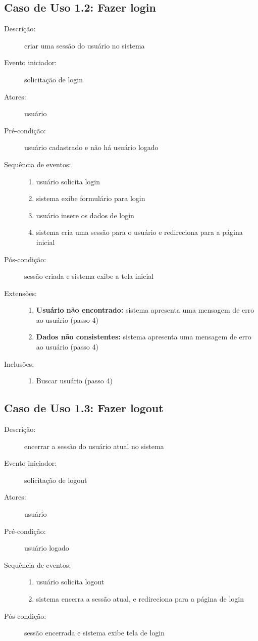 \subsection{Caso de Uso 1.2: Fazer login}
\begin{description}
	\item[Descrição:] criar uma sessão do usuário no sistema
	\item[Evento iniciador:] solicitação de login
	\item[Atores:] usuário
	\item[Pré-condição:] usuário cadastrado e não há usuário logado
	\item[Sequência de eventos:] \hfill
		\begin{enumerate}
			\item{usuário solicita login}
			\item{sistema exibe formulário para login}
			\item{usuário insere os dados de login}
			\item{sistema cria uma sessão para o usuário e redireciona para a página inicial}
		\end{enumerate}
	\item[Pós-condição:] sessão criada e sistema exibe a tela inicial
	\item[Extensões:] \hfill
		\begin{enumerate}
			\item{\textbf{Usuário não encontrado:} sistema apresenta uma mensagem de erro ao usuário (passo 4)}
			\item{\textbf{Dados não consistentes:} sistema apresenta uma mensagem de erro ao usuário (passo 4)}
		\end{enumerate}
	\item[Inclusões:] \hfill
		\begin{enumerate}
			\item{Buscar usuário (passo 4)}
		\end{enumerate}
\end{description}
%
\subsection{Caso de Uso 1.3: Fazer logout}
\begin{description}
	\item[Descrição:] encerrar a sessão do usuário atual no sistema
	\item[Evento iniciador:] solicitação de logout
	\item[Atores:] usuário
	\item[Pré-condição:] usuário logado
	\item[Sequência de eventos:] \hfill
		\begin{enumerate}
			\item{usuário solicita logout}
			\item{sistema encerra a sessão atual, e redireciona para a página de login}
		\end{enumerate}
	\item[Pós-condição:] sessão encerrada e sistema exibe tela de login
\end{description}
%
